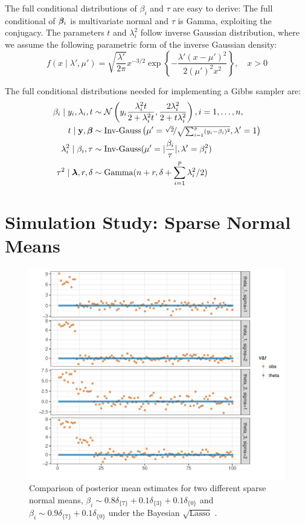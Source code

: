 \documentclass[12pt]{article}
\begin{document}
The full conditional distributions of $\beta_i$ and $\tau$ are easy to derive: The full conditional of $\boldsymbol{\beta}_i$ is multivariate normal and $\tau$ is Gamma, exploiting the conjugacy. The parameters $t$ and $\lambda_i^2$ follow inverse Gaussian distribution, where we assume the following parametric form of the inverse Gaussian density:
\[
f(x \mid \lambda', \mu') = \sqrt{\frac{\lambda'}{2\pi}} x^{-3/2} \exp\left\{ - \frac{\lambda'(x-\mu')^2}{2(\mu')^2 x^2} \right \}, \quad x > 0 
\]

The full conditional distributions needed for implementing a Gibbs sampler are:	
\begin{align}
\beta_i \mid y_i, \lambda_i, t & \sim \mathcal{N} \left(y_i \frac{\lambda_i^2 t}{2 + \lambda_i^2 t}, \frac{2 \lambda_i^2}{2 + t \lambda_i^2} \right), i = 1, \ldots, n, \\
t \mid {\bf y}, \boldsymbol{\beta} & \sim \text{Inv-Gauss} \left(\mu' = \nicefrac{\sqrt{2}}{\sqrt{\sum_{i=1}^{p}(y_i - \beta_i)^2}}, \lambda' = 1 \right) \\
\lambda_i^2 \mid \beta_i, \tau & \sim \text{Inv-Gauss}(\mu' = \lvert\frac{\beta_i}{\tau}\rvert, \lambda' = \beta_i^2)\\
\tau^2 \mid \boldsymbol{\lambda}, r, \delta & \sim \text{Gamma}(n + r, \delta + \sum_{i=1}^{p} \lambda_i^2/2)
\end{align}

\section{Simulation Study: Sparse Normal Means}
\begin{figure}[!ht]%
\centering
\includegraphics[width=\columnwidth]{art/sparse-means-sql-1}%
\caption{Comparison of posterior mean estimates for two different sparse normal means, $\beta_i \sim 0.8 \delta_{\{7\}}+0.1\delta_{\{3\}}+0.1\delta_{\{0\}}$ and $\beta_i \sim 0.9 \delta_{\{7\}}+0.1\delta_{\{0\}}$ under the Bayesian $\sqrt{\text{Lasso}}$ . }%
\label{fig:sql-sim-1}%
\end{figure}
\end{document}

